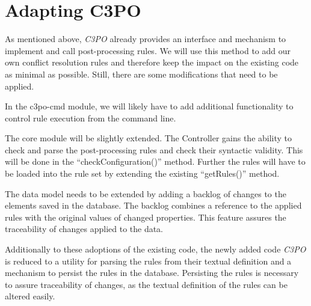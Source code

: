 \documentclass[a4paper,12pt]{article}
\begin{document}
\section{Adapting C3PO}

As mentioned above, \emph{C3PO} already provides an interface and mechanism to implement and call post-processing rules. We will use this method to add our own conflict resolution rules and therefore keep the impact on the existing code as minimal as possible. Still, there are some modifications that need to be applied.

In the c3po-cmd module, we will likely have to add additional functionality to control rule execution from the command line.

The core module will be slightly extended. The Controller gains the ability to check and parse the post-processing rules and check their syntactic validity. This will be done in the ``checkConfiguration()'' method. Further the rules will have to be loaded into the rule set by extending the existing ``getRules()'' method.

The data model needs to be extended by adding a backlog of changes to the elements saved in the database. The backlog combines a reference to the applied rules with the original values of changed properties. This feature assures the traceability of changes applied to the data.

Additionally to these adoptions of the existing code, the newly added code \emph{C3PO} is reduced to a utility for parsing the rules from their textual definition and a mechanism to persist the rules in the database. Persisting the rules is necessary to assure traceability of changes, as the textual definition of the rules can be altered easily. 
\end{document}
